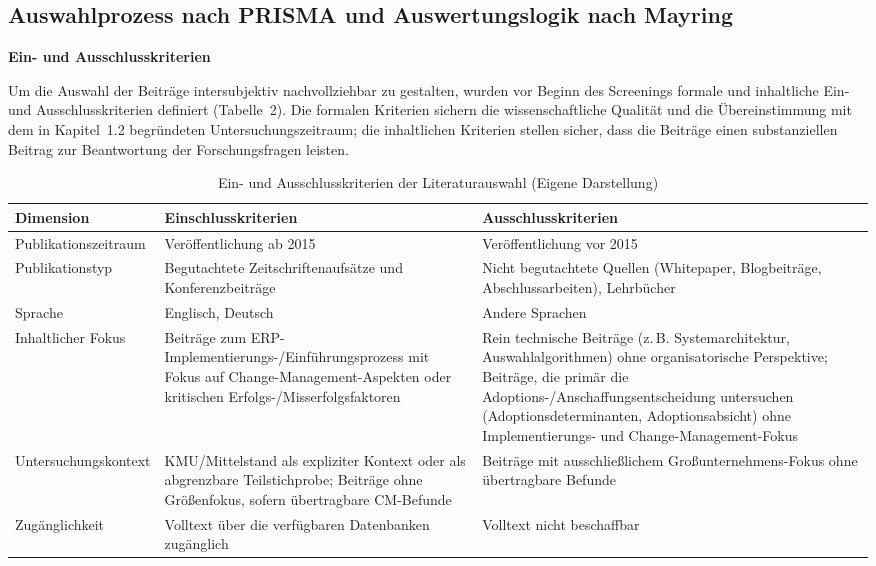 \subsection{Auswahlprozess nach PRISMA und Auswertungslogik nach Mayring}

\textbf{Ein- und Ausschlusskriterien}

Um die Auswahl der Beitr\"age intersubjektiv nachvollziehbar zu gestalten, wurden vor Beginn des Screenings formale und inhaltliche Ein- und Ausschlusskriterien definiert (Tabelle~2). Die formalen Kriterien sichern die wissenschaftliche Qualit\"at und die \"Ubereinstimmung mit dem in Kapitel~1.2 begr\"undeten Untersuchungszeitraum; die inhaltlichen Kriterien stellen sicher, dass die Beitr\"age einen substanziellen Beitrag zur Beantwortung der Forschungsfragen leisten.

\begin{table}[H]
\centering
\begin{tabularx}{\textwidth}{Xp{3.5cm}p{3.5cm}}
\toprule
\textbf{Dimension} & \textbf{Einschlusskriterien} & \textbf{Ausschlusskriterien} \\
\midrule
Publikationszeitraum & Ver\"offentlichung ab 2015 & Ver\"offentlichung vor 2015 \\
Publikationstyp & Begutachtete Zeitschriftenaufs\"atze und Konferenzbeitr\"age & Nicht begutachtete Quellen (Whitepaper, Blogbeitr\"age, Abschlussarbeiten), Lehrb\"ucher \\
Sprache & Englisch, Deutsch & Andere Sprachen \\
Inhaltlicher Fokus & Beitr\"age zum ERP-Implementierungs-/Einf\"uhrungsprozess mit Fokus auf Change-Management-Aspekten oder kritischen Erfolgs-/Misserfolgsfaktoren & Rein technische Beitr\"age (z.\,B. Systemarchitektur, Auswahlalgorithmen) ohne organisatorische Perspektive; Beitr\"age, die prim\"ar die Adoptions-/Anschaffungsentscheidung untersuchen (Adoptionsdeterminanten, Adoptionsabsicht) ohne Implementierungs- und Change-Management-Fokus \\
Untersuchungskontext & KMU/Mittelstand als expliziter Kontext oder als abgrenzbare Teilstichprobe; Beitr\"age ohne Gr\"o\ss{}enfokus, sofern \"ubertragbare CM-Befunde & Beitr\"age mit ausschlie\ss{}lichem Gro\ss{}unternehmens-Fokus ohne \"ubertragbare Befunde \\
Zug\"anglichkeit & Volltext \"uber die verf\"ugbaren Datenbanken zug\"anglich & Volltext nicht beschaffbar \\
\bottomrule
\end{tabularx}
\caption{Ein- und Ausschlusskriterien der Literaturauswahl (Eigene Darstellung)}
\label{tab:einausschluss}
\end{table}

